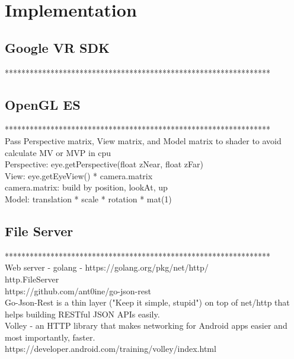 \label{chapter-implementation}
\chapter{Implementation}

\section{Google VR SDK}

****************************************************************\\%

\section{OpenGL ES}

****************************************************************\\%
Pass Perspective matrix, View matrix, and Model matrix to shader to avoid calculate MV or MVP in cpu\\
Perspective: eye.getPerspective(float zNear, float zFar)\\
View: eye.getEyeView() * camera.matrix\\
camera.matrix: build by position, lookAt, up\\
Model: translation * scale * rotation * mat(1)\\

\section{File Server}

****************************************************************\\%
Web server - golang - https://golang.org/pkg/net/http/\\
http.FileServer\\
https://github.com/ant0ine/go-json-rest\\
Go-Json-Rest is a thin layer ("Keep it simple, stupid") on top of net/http that helps building RESTful JSON APIs easily.\\
Volley - an HTTP library that makes networking for Android apps easier and most importantly, faster.\\
https://developer.android.com/training/volley/index.html\\

